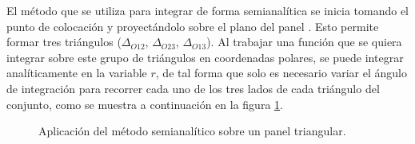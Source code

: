 \documentclass[12pt, twoside, onehalfspace, numbers, spanish]{ezthesis}
\numberwithin{equation}{section}
\begin{document}
El método que se utiliza para integrar de forma semianalítica se inicia tomando el punto de colocación y proyectándolo sobre el plano del panel \cite{Zhu}. Esto permite formar tres triángulos ($\Delta_{O12}$, $\Delta_{O23}$, $\Delta_{O13}$). Al trabajar una función que se quiera integrar sobre este grupo de triángulos en coordenadas polares, se puede integrar analíticamente en la variable $r$, de tal forma que solo es necesario variar el ángulo de integración para recorrer cada uno de los tres lados de cada triángulo del conjunto, como se muestra a continuación en la figura \ref{Fig:Fig_6}.

\begin{figure}[h]
\centering

\caption{Aplicación del método semianalítico sobre un panel triangular.}\label{Fig:Fig_6}
\end{figure}
\end{document}
